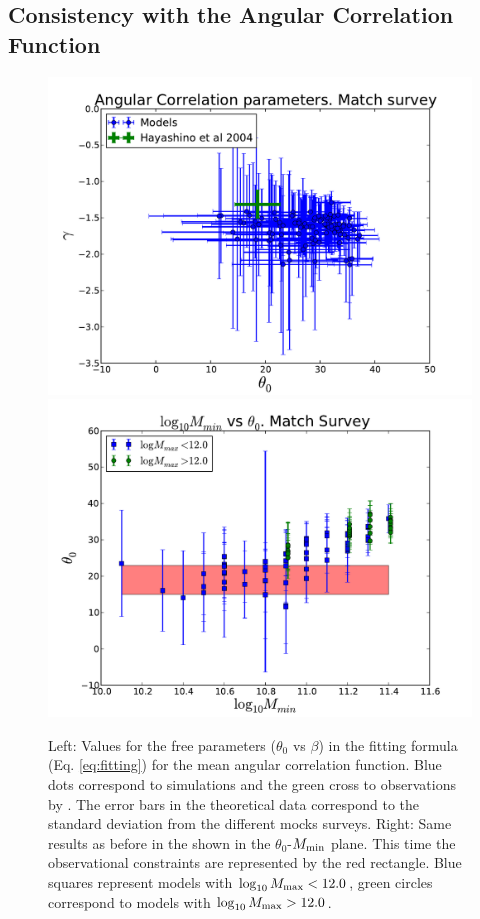 \documentclass[usenatbib]{mn2e}
\begin{document}
\subsection{Consistency with the Angular Correlation Function}



\begin{figure}
\begin{center}
\includegraphics[width=0.46\linewidth,angle=0]{./plots/power_law_correlation.pdf} 
\hspace{5mm}  
\includegraphics[width=0.46\linewidth,angle=0]{./plots/mmin_vs_correlation.pdf} 
\end{center}
\caption{Left: Values for the free parameters ($\theta_{0}$ vs $\beta$) 
in the fitting formula (Eq. \ref{eq:fitting}) for the mean angular
correlation function. Blue dots correspond to simulations and the green cross to
observations by \citet{Hayashino2004}. The error bars in the 
theoretical data correspond to the standard deviation from the
different mocks surveys. Right: Same results as before in the shown in
the $\theta_{0}$-$M_{\rm min}$ plane. This time the observational
constraints are represented by the red rectangle. Blue squares
represent models with $\log_{10} M_{\rm  max}<12.0$, green circles
correspond to models with $\log_{10} M_{\rm max}>12.0$. 
\label{figure:correlation_parameters}}
\end{figure} 
\end{document}
